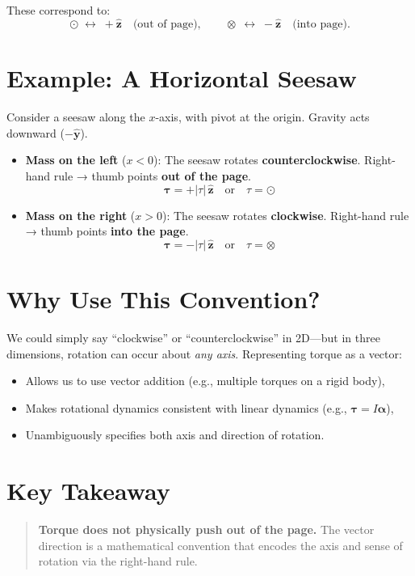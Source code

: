 \documentclass{article}
\begin{document}
These correspond to:
\[
\odot \; \leftrightarrow \; +\hat{\mathbf{z}} \quad \text{(out of page)}, \qquad
\otimes \; \leftrightarrow \; -\hat{\mathbf{z}} \quad \text{(into page)}.
\]

\section{Example: A Horizontal Seesaw}

Consider a seesaw along the $x$-axis, with pivot at the origin. Gravity acts downward ($-\hat{\mathbf{y}}$).

\begin{itemize}
\item \textbf{Mass on the left} ($x < 0$):  
    The seesaw rotates \textbf{counterclockwise}.  
    Right-hand rule → thumb points \textbf{out of the page}.  
    \[
    \boldsymbol{\tau} = +|\tau|\,\hat{\mathbf{z}} \quad \text{or} \quad \tau = \odot
    \]

    \item \textbf{Mass on the right} ($x > 0$):  
    The seesaw rotates \textbf{clockwise}.  
    Right-hand rule → thumb points \textbf{into the page}.  
    \[
    \boldsymbol{\tau} = -|\tau|\,\hat{\mathbf{z}} \quad \text{or} \quad \tau = \otimes
    \]
\end{itemize}

\section{Why Use This Convention?}

We could simply say ``clockwise'' or ``counterclockwise'' in 2D—but in three dimensions, rotation can occur about \textit{any axis}. Representing torque as a vector:
\begin{itemize}
\item Allows us to use vector addition (e.g., multiple torques on a rigid body),
    \item Makes rotational dynamics consistent with linear dynamics (e.g., $\boldsymbol{\tau} = I\boldsymbol{\alpha}$),
    \item Unambiguously specifies both axis and direction of rotation.
\end{itemize}

\section*{Key Takeaway}

\begin{quote}
    \textbf{Torque does not physically push out of the page.} The vector direction is a mathematical convention that encodes the axis and sense of rotation via the right-hand rule.
\end{quote}
\end{document}
